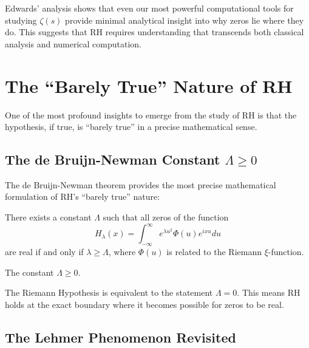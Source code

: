 \begin{lesson}
Edwards' analysis shows that even our most powerful computational tools for studying $\zeta(s)$ provide minimal analytical insight into why zeros lie where they do. This suggests that RH requires understanding that transcends both classical analysis and numerical computation.
\end{lesson}

\section{The ``Barely True'' Nature of RH}
\label{sec:barely_true}

One of the most profound insights to emerge from the study of RH is that the hypothesis, if true, is ``barely true'' in a precise mathematical sense.

\subsection{The de Bruijn-Newman Constant $\Lambda \geq 0$}
\label{subsec:debranges_newman}

The de Bruijn-Newman theorem provides the most precise mathematical formulation of RH's ``barely true'' nature:

\begin{theorem}
There exists a constant $\Lambda$ such that all zeros of the function
\begin{equation}
H_\lambda(x) = \int_{-\infty}^\infty e^{\lambda u^2} \Phi(u) e^{ixu} du
\end{equation}
are real if and only if $\lambda \geq \Lambda$, where $\Phi(u)$ is related to the Riemann $\xi$-function.
\end{theorem}

\begin{theorem}
The constant $\Lambda \geq 0$.
\end{theorem}

\begin{corollary}
The Riemann Hypothesis is equivalent to the statement $\Lambda = 0$. This means RH holds at the exact boundary where it becomes possible for zeros to be real.
\end{corollary}

\subsection{The Lehmer Phenomenon Revisited}
\label{subsec:lehmer_revisited}

